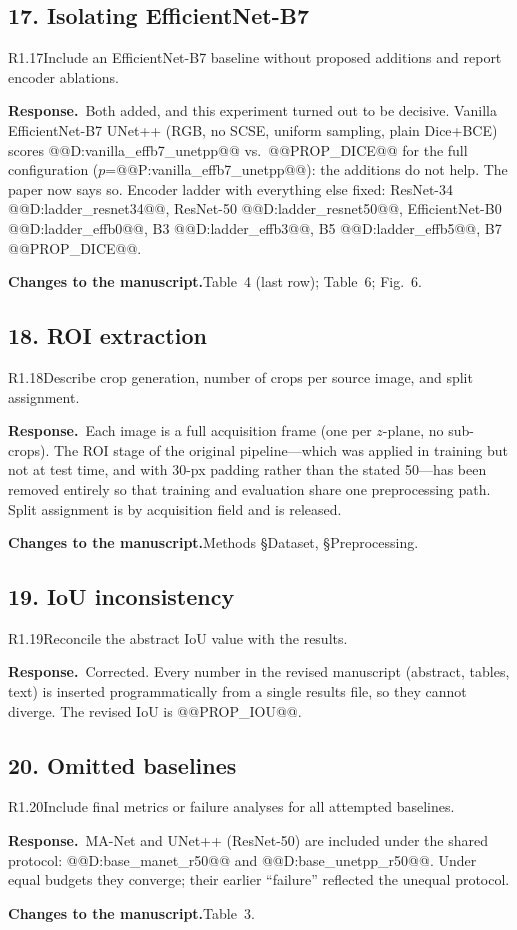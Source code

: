 \documentclass[11pt]{article}
\newcommand{\response}{\par\medskip\noindent\textbf{\color{bblue}Response.}\ }
\newcommand{\actions}{\par\medskip\noindent\textbf{Changes to the manuscript.}}
\begin{document}
\subsection*{17. Isolating EfficientNet-B7}
\begin{rcomment}{R1.17}Include an EfficientNet-B7 baseline without proposed additions and report encoder ablations.\end{rcomment}
\response Both added, and this experiment turned out to be decisive. Vanilla EfficientNet-B7 UNet++ (RGB, no SCSE, uniform sampling, plain Dice+BCE) scores @@D:vanilla_effb7_unetpp@@ vs.\ @@PROP_DICE@@ for the full configuration ($p$=@@P:vanilla_effb7_unetpp@@): the additions do not help. The paper now says so. Encoder ladder with everything else fixed: ResNet-34 @@D:ladder_resnet34@@, ResNet-50 @@D:ladder_resnet50@@, EfficientNet-B0 @@D:ladder_effb0@@, B3 @@D:ladder_effb3@@, B5 @@D:ladder_effb5@@, B7 @@PROP_DICE@@.
\actions Table~4 (last row); Table~6; Fig.~6.

\subsection*{18. ROI extraction}
\begin{rcomment}{R1.18}Describe crop generation, number of crops per source image, and split assignment.\end{rcomment}
\response Each image is a full acquisition frame (one per $z$-plane, no sub-crops). The ROI stage of the original pipeline---which was applied in training but not at test time, and with 30-px padding rather than the stated 50---has been removed entirely so that training and evaluation share one preprocessing path. Split assignment is by acquisition field and is released.
\actions Methods §Dataset, §Preprocessing.

\subsection*{19. IoU inconsistency}
\begin{rcomment}{R1.19}Reconcile the abstract IoU value with the results.\end{rcomment}
\response Corrected. Every number in the revised manuscript (abstract, tables, text) is inserted programmatically from a single results file, so they cannot diverge. The revised IoU is @@PROP_IOU@@.

\subsection*{20. Omitted baselines}
\begin{rcomment}{R1.20}Include final metrics or failure analyses for all attempted baselines.\end{rcomment}
\response MA-Net and UNet++ (ResNet-50) are included under the shared protocol: @@D:base_manet_r50@@ and @@D:base_unetpp_r50@@. Under equal budgets they converge; their earlier ``failure'' reflected the unequal protocol.
\actions Table~3.
\end{document}
